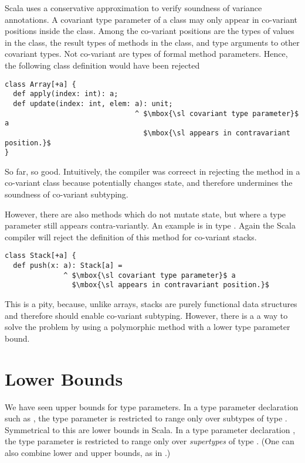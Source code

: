 \documentclass[a4paper,12pt,twoside,titlepage]{book}
\begin{document}
Scala uses a conservative approximation to verify soundness of
variance annotations.  A covariant type parameter of a class may only
appear in co-variant positions inside the class.  Among the co-variant
positions are the types of values in the class, the result types of
methods in the class, and type arguments to other covariant types. Not
co-variant are types of formal method parameters. Hence, the following
class definition would have been rejected
\begin{lstlisting}
class Array[+a] {
  def apply(index: int): a;
  def update(index: int, elem: a): unit;
                               ^ $\mbox{\sl covariant type parameter}$ a
                                 $\mbox{\sl appears in contravariant position.}$
}
\end{lstlisting}
So far, so good. Intuitively, the compiler was correect in rejecting
the  method in a co-variant class because 
potentially changes state, and therefore undermines the soundness of
co-variant subtyping. 

However, there are also methods which do not mutate state, but where a
type parameter still appears contra-variantly. An example is
 in type . Again the Scala compiler will reject
the definition of this method for co-variant stacks.
\begin{lstlisting}
class Stack[+a] {
  def push(x: a): Stack[a] = 
              ^ $\mbox{\sl covariant type parameter}$ a
                $\mbox{\sl appears in contravariant position.}$
\end{lstlisting}
This is a pity, because, unlike arrays, stacks are purely functional data
structures and therefore should enable co-variant subtyping. However,
there is a a way to solve the problem by using a polymorphic method
with a lower type parameter bound.

\section{Lower Bounds}

We have seen upper bounds for type parameters. In a type parameter
declaration such as , the type parameter  is
restricted to range only over subtypes of type . Symmetrical
to this are lower bounds in Scala. In a type parameter declaration
, the type parameter  is restricted to range only
over {\em supertypes} of type . (One can also combine lower and
upper bounds, as in .)
\end{document}
